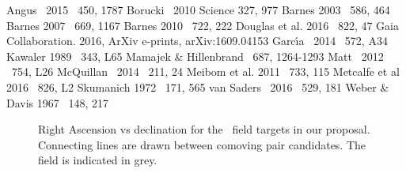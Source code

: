 
\begin{references}
 Angus \etal\ 2015 \mnras\ 450, 1787
 Borucki \etal\ 2010 Science 327, 977
 Barnes 2003 \apj\ 586, 464
 Barnes 2007 \apj\ 669, 1167
 Barnes 2010 \apj\ 722, 222
 Douglas et al. 2016 \apj\ 822, 47
 Gaia Collaboration. 2016, ArXiv e-prints, arXiv:1609.04153
 Garc{\'{\i}}a \etal\ 2014 \aap\ 572, A34
 Kawaler 1989 \apjl\ 343, L65
 Mamajek \& Hillenbrand \apj\ 687, 1264-1293
 Matt \etal\ 2012 \apjl\ 754, L26
 McQuillan \etal\ 2014 \apjs\ 211, 24
 Meibom et al. 2011 \apj\ 733, 115
 Metcalfe et al 2016 \apjl\ 826, L2
 Skumanich 1972 \apj\ 171, 565
 van Saders \etal\ 2016 \nat\ 529, 181
 Weber \& Davis 1967 \apj\ 148, 217
\end{references}

\begin{figure}
\caption{Right Ascension vs declination for the \kepler\ field targets in our
proposal.
Connecting lines are drawn between comoving pair candidates.
The \kepler field is indicated in grey.}
\end{figure}

